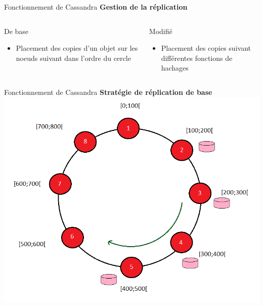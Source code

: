 \documentclass{beamer}
\newcommand{\success}{\color{SuccessGreen}\CheckmarkBold}
\begin{document}
\begin{frame}{Fonctionnement de Cassandra}
\textbf{Gestion de la réplication}
\begin{columns}
\begin{column}[c]{5cm}
\begin{block}{De base}
\begin{itemize}
	\item Placement des copies d'un objet sur les noeuds suivant dans l'ordre du cercle
\end{itemize}
\end{block}
\end{column}

\begin{column}[c]{5cm}
\begin{block}{Modifié}
\begin{itemize}
	\item[\success] Placement des copies suivant différentes fonctions de hachages
\end{itemize}
\end{block}
\end{column}
\end{columns}
\end{frame}

\begin{frame}{Fonctionnement de Cassandra}
\textbf{Stratégie de réplication de base}
\centering
    \includegraphics[scale=0.4]{replication}
\end{frame}
\end{document}
